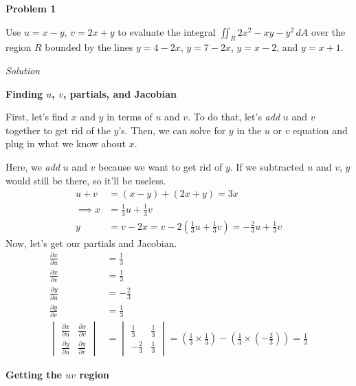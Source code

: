 \documentclass{article}
\newcommand{\lrp}[1]{\left( #1 \right)}
\newcommand{\Solution}{\textit{Solution}}
\begin{document}
{}\textbf{Problem 1}

Use $u=x-y$, $v=2x+y$ to evaluate the integral $\displaystyle \iint_R 2x^2-xy-y^2\,dA$ over the region $R$ bounded by the lines $y=4-2x$, $y=7-2x$, $y=x-2$, and $y=x+1$.

\Solution

{}\textbf{Finding $u$, $v$, partials, and Jacobian}

First, let's find $x$ and $y$ in terms of $u$ and $v$. To do that, let's \textit{add} $u$ and $v$ together to get rid of the $y$'s. Then, we can solve for $y$ in the $u$ or $v$ equation and plug in what we know about $x$.

Here, we \textit{add} $u$ and $v$ because we want to get rid of $y$. If we subtracted $u$ and $v$, $y$ would still be there, so it'll be useless.
\begin{align*}
    u+v&=(x-y)+(2x+y)=3x\\
    \implies x &= \frac{1}{3}u+\frac{1}{3}v\\
    y &= v - 2x = v - 2\lrp{\frac{1}{3}u+\frac{1}{3}v}=-\frac{2}{3}u+\frac{1}{3}v\tag{let's use $v=2x+y$ and solve for $y$}
\end{align*}
Now, let's get our partials and Jacobian.
\begin{align*}
     \frac{\partial x}{\partial u} &= \frac{1}{3}\\
    \frac{\partial x}{\partial v} &=\frac{1}{3}\\
    \frac{\partial y}{\partial u}&= -\frac{2}{3}\\
     \frac{\partial y}{\partial v}&= \frac{1}{3}\\
    \begin{vmatrix}
    \frac{\partial x}{\partial u} & \frac{\partial x}{\partial v}\\
    \frac{\partial y}{\partial u} & 
    \frac{\partial y}{\partial v}
    \end{vmatrix}&=\begin{vmatrix}
      \frac{1}{3} & \frac{1}{3}\\
      -\frac{2}{3} & \frac{1}{3}
    \end{vmatrix}=\lrp{\frac{1}{3}\times\frac{1}{3}}-\lrp{\frac{1}{3}\times\lrp{-\frac{2}{3}}}=\frac{1}{3}
\end{align*}
{}\textbf{Getting the $uv$ region}
\end{document}
